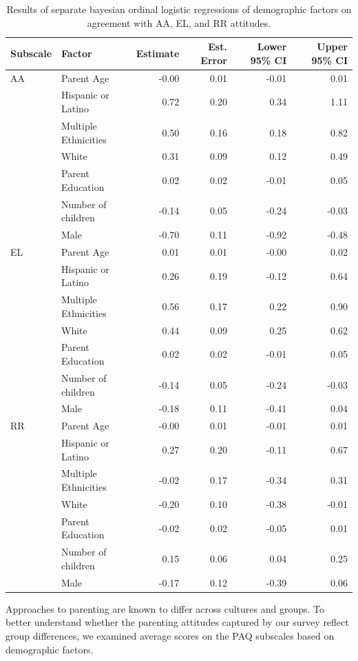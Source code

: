 \documentclass[floatsintext,man]{apa6}
\theoremstyle{definition}
\theoremstyle{definition}
\theoremstyle{definition}
\theoremstyle{remark}
\begin{document}
\begin{table}[H]
\centering
\caption{Results of separate bayesian ordinal logistic regressions of demographic factors on agreement with AA, EL, and RR attitudes.} 
\label{tab:demo}
\begin{tabular}{llrrrr}
  \hline
Subscale & Factor & Estimate & Est. Error & Lower 95\% CI & Upper 95\% CI \\ 
  \hline
AA & Parent Age & -0.00 & 0.01 & -0.01 & 0.01 \\ 
   & Hispanic or Latino & 0.72 & 0.20 & 0.34 & 1.11 \\ 
   & Multiple Ethnicities & 0.50 & 0.16 & 0.18 & 0.82 \\ 
   & White & 0.31 & 0.09 & 0.12 & 0.49 \\ 
   & Parent Education & 0.02 & 0.02 & -0.01 & 0.05 \\ 
   & Number of children & -0.14 & 0.05 & -0.24 & -0.03 \\ 
   & Male & -0.70 & 0.11 & -0.92 & -0.48 \\ 
   \hline
EL & Parent Age & 0.01 & 0.01 & -0.00 & 0.02 \\ 
   & Hispanic or Latino & 0.26 & 0.19 & -0.12 & 0.64 \\ 
   & Multiple Ethnicities & 0.56 & 0.17 & 0.22 & 0.90 \\ 
   & White & 0.44 & 0.09 & 0.25 & 0.62 \\ 
   & Parent Education & 0.02 & 0.02 & -0.01 & 0.05 \\ 
   & Number of children & -0.14 & 0.05 & -0.24 & -0.03 \\ 
   & Male & -0.18 & 0.11 & -0.41 & 0.04 \\ 
   \hline
RR & Parent Age & -0.00 & 0.01 & -0.01 & 0.01 \\ 
   & Hispanic or Latino & 0.27 & 0.20 & -0.11 & 0.67 \\ 
   & Multiple Ethnicities & -0.02 & 0.17 & -0.34 & 0.31 \\ 
   & White & -0.20 & 0.10 & -0.38 & -0.01 \\ 
   & Parent Education & -0.02 & 0.02 & -0.05 & 0.01 \\ 
   & Number of children & 0.15 & 0.06 & 0.04 & 0.25 \\ 
   & Male & -0.17 & 0.12 & -0.39 & 0.06 \\ 
   \hline
\end{tabular}
\end{table}

Approaches to parenting are known to differ across cultures and groups.
To better understand whether the parenting attitudes captured by our
survey reflect group differences, we examined average scores on the PAQ
subscales based on demographic factors.
\end{document}
